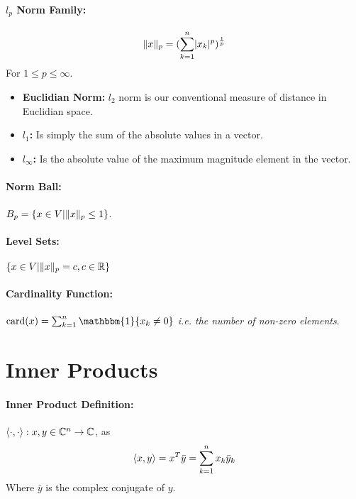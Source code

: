 \documentclass[a4paper,12pt]{report}
\DeclarePairedDelimiter\abs{\lvert}{\rvert}%
\DeclarePairedDelimiter\norm{\lVert}{\rVert}%
\DeclarePairedDelimiter\inpr{\langle}{\rangle}%
\def\reals{\mathbb{R}}
\begin{document}
\paragraph{$l_p$ Norm Family: } \begin{equation}
\norm{x}_p = (\sum_{k=1}^{n} \abs{x_k}^p)^{\frac{1}{p}}
\end{equation}
For $1 \leq p \leq \infty$.

\begin{itemize}
\item \textbf{Euclidian Norm: } $l_2$ norm is our conventional measure of distance in Euclidian space.
\item \textbf{$l_1$: } Is simply the sum of the absolute values in a vector.
\item \textbf{$l_\infty$: } Is the absolute value of the maximum magnitude element in the vector.
\end{itemize}

\paragraph{Norm Ball: } $B_p = \{x\in V | \norm{x}_p \leq 1\}$.

\paragraph{Level Sets: } $\{x\in V | \norm{x}_p = c, c\in\reals\}$

\paragraph{Cardinality Function: } $\text{card}(x) = \sum_{k=1}^{n} \mathbbm{1}\{x_k \neq 0\}$ \textit{i.e. the number of non-zero elements}.



\section{Inner Products}

\paragraph{Inner Product Definition: } $\inpr{\cdot,\cdot}: x, y\in\mathbb{C}^n \to \mathbb{C}$, as \begin{equation}
\inpr{x, y} = x^T\bar{y} = \sum_{k=1}^{n} x_k \bar{y}_k
\end{equation}
Where $\bar{y}$ is the complex conjugate of $y$.
\end{document}
